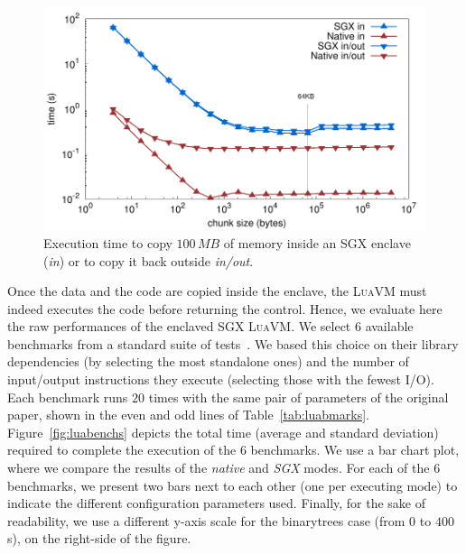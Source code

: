 \begin{figure}[t!]
  \centering
  \includegraphics[width=\linewidth]{plots/memcpy/memcpy}
  \caption{Execution time to copy $100\,MB$ of memory inside an SGX enclave (\emph{in}) or to copy it back outside {\emph{in/out}.} }
  \label{fig:sgxmemcpy}
\end{figure}

Once the data and the code are copied inside the enclave, the \textsc{LuaVM} must indeed executes the code before returning the control.
Hence, we evaluate here the raw performances of the enclaved SGX \textsc{LuaVM}.
We select $6$ available benchmarks from a standard suite of tests~\cite{bolz2015}.
We based this choice on their library dependencies (by selecting the most standalone ones) and the number of input/output instructions they execute (selecting those with the fewest I/O).
Each benchmark runs $20$ times with the same pair of parameters of the original paper, shown in the even and odd lines of Table~\ref{tab:luabmarks}.
Figure~\ref{fig:luabenchs} depicts the total time (average and standard deviation) required to complete the execution of the 6 benchmarks.
We use a bar chart plot, where we compare the results of the \emph{native} and \emph{SGX} modes.
For each of the $6$ benchmarks, we present two bars next to each other (one per executing mode) to indicate the different configuration parameters used.
Finally, for the sake of readability, we use a different y-axis scale for the \textsf{binarytrees} case (from $0$ to $400$\,s), on the right-side of the figure.

